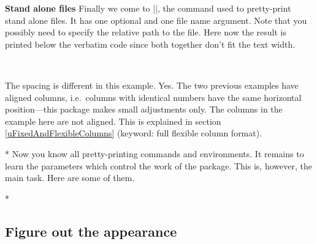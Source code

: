 \begin{paracol}{2}
\textbf{Stand alone files}
Finally we come to ||, the command used to pretty-print
stand alone files. It has one optional and one file name argument.
Note that you possibly need to specify the relative path to the file.
Here now the result is printed below the verbatim code since both together
don't fit the text width.
\begin{lstsample}{\lstset{comment=[l]\%,columns=fullflexible}}^^A
      {\lstset{alsoletter=\\,emph=\,emphstyle=\rstyle}^^A
      \lstaspectindex{}{}}
   
\end{lstsample}
\begin{advise}
\item The spacing is different in this example.
      \advisespace
      Yes. The two previous examples have aligned columns, i.e.~columns with
      identical numbers have the same horizontal position---this package
      makes small adjustments only. The columns in the example here are not
      aligned. This is explained in section \ref{uFixedAndFlexibleColumns}
      (keyword: full flexible column format).
\end{advise}
\switchcolumn

\switchcolumn[0]*%
Now you know all pretty-printing commands and environments. It remains
to learn the parameters which control the work of the 
package. This is, however, the main task. Here are some of them.
\switchcolumn

\switchcolumn[0]*%
\subsection{Figure out the appearance}\label{gFigureOutTheAppearance}
\switchcolumn


\end{paracol}
